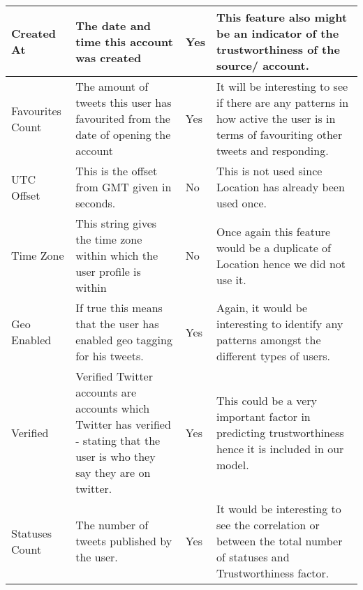 \begin{landscape}
\begin{longtable}{|C{1.00in}|C{2.50in}|C{.60in}|C{5.00in}|}
\hline    
Created At                         & The date and time this account was created                                                                                     & Yes         & This feature also might be an indicator of the trustworthiness of the source/ account.                                                                                                           \\
\hline    
Favourites Count                   & The amount of tweets this user has favourited from the date of opening the account                                             & Yes         & It will be interesting to see if there are any patterns in how active the user is in terms of favouriting other tweets and responding.                                                           \\
\hline    
UTC Offset                         & This is the offset from GMT given in seconds.                                                                                  & No          & This is not used since Location has already been used once.                                                                                                                                      \\
\hline    
Time Zone                          & This string gives the time zone within which the user profile is within                                                        & No          & Once again this feature would be a duplicate of Location hence we did not use it.                                                                                                                \\
\hline    
Geo Enabled                        & If true this means that the user has enabled geo tagging for his tweets.                                                       & Yes         & Again, it would be interesting to identify any patterns amongst the different types of users.                                                                                                    \\
\hline    
Verified                           & Verified Twitter accounts are accounts which Twitter has verified - stating that the user is who they say they are on twitter. & Yes         & This could be a very important factor in predicting trustworthiness hence it is included in our model.                                                                                           \\
\hline    
Statuses Count                     & The number of tweets published by the user.                                                                                    & Yes         & It would be interesting to see the correlation or between the total number of statuses and Trustworthiness factor.                                                                               \\

\end{longtable}
\end{landscape}

